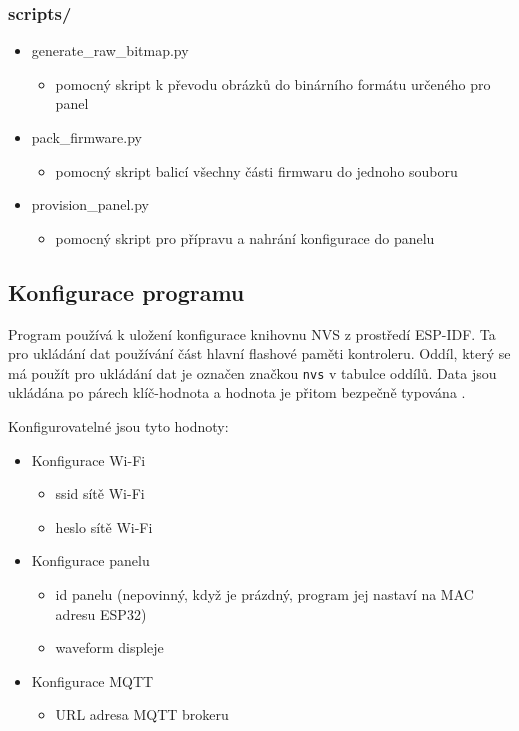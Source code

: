\subsubsection*{scripts/}
\begin{itemize}
    \item generate\_raw\_bitmap.py
    \begin{itemize}
        \item pomocný skript k převodu obrázků do binárního formátu určeného pro panel
    \end{itemize}
    \item pack\_firmware.py
    \begin{itemize}
        \item pomocný skript balicí všechny části firmwaru do jednoho souboru
    \end{itemize}
    \item provision\_panel.py
    \begin{itemize}
        \item pomocný skript pro přípravu a nahrání konfigurace do panelu
    \end{itemize}
\end{itemize}

\subsection{Konfigurace programu}\label{konfigurace-panelu}
Program používá k uložení konfigurace knihovnu NVS z prostředí ESP-IDF. Ta pro ukládání dat používání část hlavní flashové paměti kontroleru. Oddíl, který se má použít pro ukládání dat je označen značkou \lstinline|nvs| v tabulce oddílů. Data jsou ukládána po párech klíč-hodnota a hodnota je přitom bezpečně typována \cite{NonVolatileStorageLibrary}.

Konfigurovatelné jsou tyto hodnoty:
\begin{itemize}
    \item Konfigurace Wi-Fi
    \begin{itemize}
        \item ssid sítě Wi-Fi
        \item heslo sítě Wi-Fi
    \end{itemize}
    \item Konfigurace panelu
    \begin{itemize}
        \item id panelu (nepovinný, když je prázdný, program jej nastaví na MAC adresu ESP32)
        \item waveform displeje
    \end{itemize}
    \item Konfigurace MQTT
    \begin{itemize}
        \item URL adresa MQTT brokeru
    \end{itemize}
\end{itemize}

